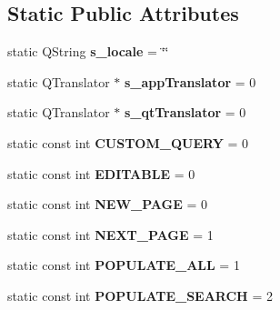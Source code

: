 \subsection*{Static Public Attributes}
\begin{DoxyCompactItemize}
\item 
static Q\+String {\bfseries s\+\_\+locale} = \char`\"{}\char`\"{}\hypertarget{classbiblioteq_a531cce7604bd675011719b1ca767081f}{}\label{classbiblioteq_a531cce7604bd675011719b1ca767081f}

\item 
static Q\+Translator $\ast$ {\bfseries s\+\_\+app\+Translator} = 0\hypertarget{classbiblioteq_ab62168fc59cdc975ed118587acc643f4}{}\label{classbiblioteq_ab62168fc59cdc975ed118587acc643f4}

\item 
static Q\+Translator $\ast$ {\bfseries s\+\_\+qt\+Translator} = 0\hypertarget{classbiblioteq_a63e565603b391d30909c382e9a648a20}{}\label{classbiblioteq_a63e565603b391d30909c382e9a648a20}

\item 
static const int {\bfseries C\+U\+S\+T\+O\+M\+\_\+\+Q\+U\+E\+RY} = 0\hypertarget{classbiblioteq_ad32b3a87e24c6da29ad38e82a5621a74}{}\label{classbiblioteq_ad32b3a87e24c6da29ad38e82a5621a74}

\item 
static const int {\bfseries E\+D\+I\+T\+A\+B\+LE} = 0\hypertarget{classbiblioteq_a6428b315b0e99be77392694e701e6613}{}\label{classbiblioteq_a6428b315b0e99be77392694e701e6613}

\item 
static const int {\bfseries N\+E\+W\+\_\+\+P\+A\+GE} = 0\hypertarget{classbiblioteq_a6d7869e8f55f035a4579dbfbdcc7ae90}{}\label{classbiblioteq_a6d7869e8f55f035a4579dbfbdcc7ae90}

\item 
static const int {\bfseries N\+E\+X\+T\+\_\+\+P\+A\+GE} = 1\hypertarget{classbiblioteq_a4e6e213d931046a9ae10fcfb89cd4080}{}\label{classbiblioteq_a4e6e213d931046a9ae10fcfb89cd4080}

\item 
static const int {\bfseries P\+O\+P\+U\+L\+A\+T\+E\+\_\+\+A\+LL} = 1\hypertarget{classbiblioteq_a60719fb6ee0ebb342d9cc10771503d3f}{}\label{classbiblioteq_a60719fb6ee0ebb342d9cc10771503d3f}

\item 
static const int {\bfseries P\+O\+P\+U\+L\+A\+T\+E\+\_\+\+S\+E\+A\+R\+CH} = 2\hypertarget{classbiblioteq_a09b1c95cd2e1949a5d2d8b2c13c76042}{}\label{classbiblioteq_a09b1c95cd2e1949a5d2d8b2c13c76042}


\end{DoxyCompactItemize}
